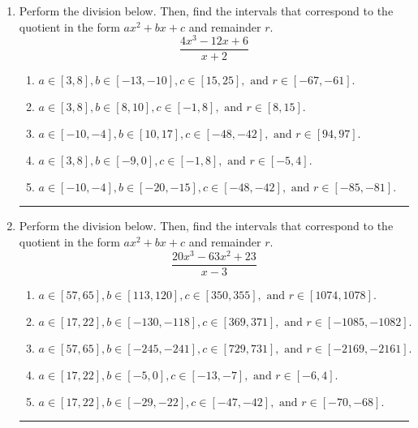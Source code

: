 \documentclass[14pt]{extbook}
\newcommand{\litem}[1]{\item#1\hspace*{-1cm}\rule{\textwidth}{0.4pt}}
\begin{document}
\begin{enumerate}
{\begin{enumerate}[label=\Alph*.]
\end{enumerate} }
\litem{
Perform the division below. Then, find the intervals that correspond to the quotient in the form $ax^2+bx+c$ and remainder $r$.\[ \frac{4x^{3} -12 x + 6}{x + 2} \]\begin{enumerate}[label=\Alph*.]
\item \( a \in [3, 8], b \in [-13, -10], c \in [15, 25], \text{ and } r \in [-67, -61]. \)
\item \( a \in [3, 8], b \in [8, 10], c \in [-1, 8], \text{ and } r \in [8, 15]. \)
\item \( a \in [-10, -4], b \in [10, 17], c \in [-48, -42], \text{ and } r \in [94, 97]. \)
\item \( a \in [3, 8], b \in [-9, 0], c \in [-1, 8], \text{ and } r \in [-5, 4]. \)
\item \( a \in [-10, -4], b \in [-20, -15], c \in [-48, -42], \text{ and } r \in [-85, -81]. \)

\end{enumerate} }
\litem{
Perform the division below. Then, find the intervals that correspond to the quotient in the form $ax^2+bx+c$ and remainder $r$.\[ \frac{20x^{3} -63 x^{2} + 23}{x -3} \]\begin{enumerate}[label=\Alph*.]
\item \( a \in [57, 65], b \in [113, 120], c \in [350, 355], \text{ and } r \in [1074, 1078]. \)
\item \( a \in [17, 22], b \in [-130, -118], c \in [369, 371], \text{ and } r \in [-1085, -1082]. \)
\item \( a \in [57, 65], b \in [-245, -241], c \in [729, 731], \text{ and } r \in [-2169, -2161]. \)
\item \( a \in [17, 22], b \in [-5, 0], c \in [-13, -7], \text{ and } r \in [-6, 4]. \)
\item \( a \in [17, 22], b \in [-29, -22], c \in [-47, -42], \text{ and } r \in [-70, -68]. \)


\end{enumerate}}
\end{enumerate}
\end{document}
